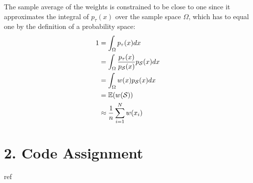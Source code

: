 \documentclass [a4paper] {report}
\begin{document}
	The sample average of the weights is constrained to be close to one since it approximates the integral of $p_{\tau}(x)$ over the sample space $\Omega$, which has to equal one by the definition of a probability space:
	\begin{align*}
		1 &= \int_{\Omega} p_{\tau}(x)dx\\
		&= \int_{\Omega} {p_{\tau}(x) \over p_{\mathcal{S}}(x)}p_{\mathcal{S}}(x)dx\\
		&= \int_{\Omega} w(x)p_{\mathcal{S}}(x)dx\\
		&= \mathbb{E}(w(\mathcal{S}))\\
		&\approx {1\over n} \sum_{i=1}^{N}  w(x_{i})
	\end{align*}
	
	\section*{2. Code Assignment}
	
	
	
	\begin{bibliography}{ref}
		
	\end{bibliography}
\end{document}
